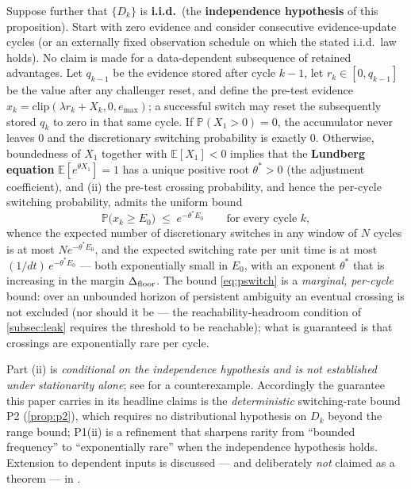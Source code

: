 \begin{proposition}
Suppose further that $\{D_k\}$ is \textbf{i.i.d.}\ (the \textbf{independence hypothesis} of this proposition). Start with zero evidence and consider consecutive evidence-update cycles (or an externally fixed observation schedule on which the stated i.i.d.\ law holds). No claim is made for a data-dependent subsequence of retained advantages. Let $q_{k-1}$ be the evidence stored after cycle $k-1$, let $r_k\in[0,q_{k-1}]$ be the value after any challenger reset, and define the pre-test evidence $x_k=\mathrm{clip}(\lambda r_k+X_k,0,e_{\max})$; a successful switch may reset the subsequently stored $q_k$ to zero in that same cycle. If $\mathbb{P}(X_1 > 0) = 0$, the accumulator never leaves $0$ and the discretionary switching probability is exactly $0$. Otherwise, boundedness of $X_1$ together with $\mathbb{E}[X_1] < 0$ implies that the \textbf{Lundberg equation} $\mathbb{E}[e^{\theta X_1}] = 1$ has a unique positive root $\theta^* > 0$ (the adjustment coefficient), and (ii) the pre-test crossing probability, and hence the per-cycle switching probability, admits the uniform bound
\begin{equation}
\mathbb{P}\big(x_k \ge E_0\big) \;\le\; e^{-\theta^* E_0} \qquad \text{for every cycle } k,
\label{eq:pswitch}
\end{equation}
whence the expected number of discretionary switches in any window of $N$ cycles is at most $N e^{-\theta^* E_0}$, and the expected switching rate per unit time is at most $(1/dt)\, e^{-\theta^* E_0}$ --- both exponentially small in $E_0$, with an exponent $\theta^*$ that is increasing in the margin $\Delta_{\text{floor}}$. The bound \eqref{eq:pswitch} is a \emph{marginal, per-cycle} bound: over an unbounded horizon of persistent ambiguity an eventual crossing is not excluded (nor should it be --- the reachability-headroom condition of \cref{subsec:leak} requires the threshold to be reachable); what is guaranteed is that crossings are exponentially rare per cycle.

Part (ii) is \emph{conditional on the independence hypothesis and is not established under stationarity alone}; see  for a counterexample. Accordingly the guarantee this paper carries in its headline claims is the \emph{deterministic} switching-rate bound P2 (\cref{prop:p2}), which requires no distributional hypothesis on $D_k$ beyond the range bound; P1(ii) is a refinement that sharpens rarity from ``bounded frequency'' to ``exponentially rare'' when the independence hypothesis holds. Extension to dependent inputs is discussed --- and deliberately \emph{not} claimed as a theorem --- in .
\end{proposition}

